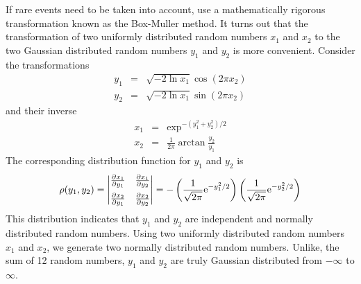 If rare events need to be taken into account, use a mathematically rigorous transformation known as the Box-Muller method.  It turns out that the transformation of two uniformly distributed random numbers $x_1$ and $x_2$ to the two Gaussian distributed random numbers $y_1$ and $y_2$ is more convenient.  Consider the transformations
\begin{subequations}
\begin{eqnarray}
y_1 &=& \sqrt{-2 \ln x_1} \cos(2\pi x_2) \\
y_2 &=& \sqrt{-2 \ln x_1} \sin(2\pi x_2)
\end{eqnarray}
\end{subequations}
and their inverse 
\begin{subequations}
\begin{eqnarray}
x_1 &=& \exp^{-(y_1^2+y_2^2)/2} \\
x_2 &=& \frac{1}{2\pi} \arctan \frac{y_2}{y_1}
\end{eqnarray}
\end{subequations}
The corresponding distribution function for $y_1$ and $y_2$ is
\begin{equation}
\rho(y_1,y_2) =  \left | \begin{matrix} \frac{\partial x_1}{\partial y_1} & \frac{\partial x_1}{\partial y_2} \\[1.5ex]
 \frac{\partial x_2}{\partial y_1} & \frac{\partial x_2}{\partial y_2} \end{matrix} \right |
 = - \left ( \frac{1}{\sqrt{2\pi}} \text{e}^{-y_1^2/2} \right ) \left ( \frac{1}{\sqrt{2\pi}} \text{e}^{-y_2^2/2} \right )
\end{equation}
This distribution indicates that $y_1$ and $y_2$ are independent and normally distributed random numbers. Using two uniformly distributed random numbers $x_1$ and $x_2$, we generate two normally distributed random numbers.  Unlike, the sum of 12 random numbers, $y_1$ and $y_2$ are truly Gaussian distributed from $-\infty$ to $\infty$. 


